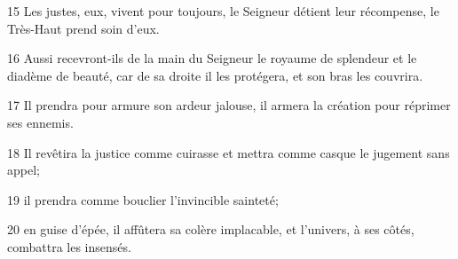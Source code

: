 15 Les justes, eux, vivent pour toujours, le Seigneur détient leur récompense, le Très-Haut prend soin d’eux.

16 Aussi recevront-ils de la main du Seigneur le royaume de splendeur et le diadème de beauté, car de sa droite il les protégera, et son bras les couvrira.

17 Il prendra pour armure son ardeur jalouse, il armera la création pour réprimer ses ennemis.

18 Il revêtira la justice comme cuirasse et mettra comme casque le jugement sans appel;

19 il prendra comme bouclier l’invincible sainteté;

20 en guise d’épée, il affûtera sa colère implacable, et l’univers, à ses côtés, combattra les insensés.
